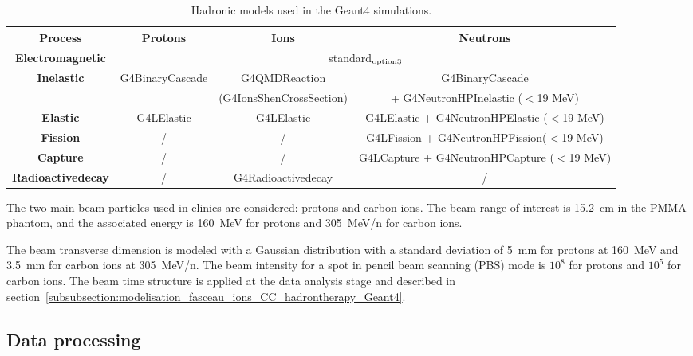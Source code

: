 \begin{table}
\label{physlist_ion}
\caption{Hadronic models used in the Geant4 simulations.}
\begin{scriptsize}
\begin{center}
\renewcommand{\arraystretch}{1.2}
\begin{tabular} {cccc}\hline
\textbf{Process} & \textbf{Protons} & \textbf{Ions} & \textbf{Neutrons} \\ \hline 
\textbf{Electromagnetic} & \multicolumn{3}{c}{standard$_{\rm{option3}}$} \\ %
\textbf{Inelastic} & G4BinaryCascade & G4QMDReaction  &  G4BinaryCascade  \\ 
 & & (G4IonsShenCrossSection)&+ G4NeutronHPInelastic ($<$19 MeV)\\ %
\textbf{Elastic} & G4LElastic & G4LElastic & G4LElastic + G4NeutronHPElastic ($<$19 MeV)\\ %
\textbf{Fission} & / & / & G4LFission + G4NeutronHPFission($<$19 MeV) \\ %
\textbf{Capture} & / & / & G4LCapture +  G4NeutronHPCapture ($<$19 MeV) \\ %
\textbf{Radioactivedecay} & / & G4Radioactivedecay & / \\ \hline
\end{tabular}
\end{center}
\end{scriptsize}
\label{table:table_modele_physic_CC_simulation_Hadronth}
\end{table}

The two main beam particles used in clinics are considered: protons and carbon ions. The beam range of interest is 15.2~cm in the PMMA phantom, and the associated energy is 160~MeV for protons and 305~MeV/n for carbon ions.
 
The beam transverse dimension is modeled with a Gaussian distribution with a standard deviation of 5~mm for protons at 160~MeV and 3.5~mm for carbon ions at 305~MeV/n. The beam intensity for a spot in pencil beam scanning (PBS) mode is $10^8$ for protons and $10^5$ for carbon ions. The beam time structure is applied at the data analysis stage and described in section~\ref{subsubsection:modelisation_fasceau_ions_CC_hadrontherapy_Geant4}.\newline

\subsection{Data processing}
\label{subsection:Treatment_data_CC_hadrontherapy_Geant4}


